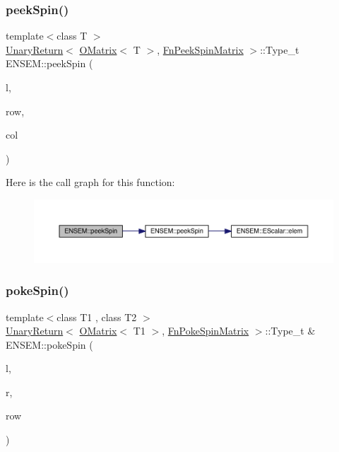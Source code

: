 \subsubsection{\texorpdfstring{peekSpin()}{peekSpin()}\hspace{0.1cm}{\footnotesize\ttfamily [2/2]}}
{\footnotesize\ttfamily template$<$class T $>$ \\
\mbox{\hyperlink{structENSEM_1_1UnaryReturn}{Unary\+Return}}$<$ \mbox{\hyperlink{classENSEM_1_1OMatrix}{O\+Matrix}}$<$ T $>$, \mbox{\hyperlink{structENSEM_1_1FnPeekSpinMatrix}{Fn\+Peek\+Spin\+Matrix}} $>$\+::Type\+\_\+t E\+N\+S\+E\+M\+::peek\+Spin (\begin{DoxyParamCaption}\item[{const \mbox{\hyperlink{classENSEM_1_1OMatrix}{O\+Matrix}}$<$ T $>$ \&}]{l,  }\item[{int}]{row,  }\item[{int}]{col }\end{DoxyParamCaption})\hspace{0.3cm}{\ttfamily [inline]}}

Here is the call graph for this function\+:\nopagebreak
\begin{figure}[H]
\begin{center}
\leavevmode
\includegraphics[width=350pt]{d8/d55/group__obsmatrix_ga5d47056fa4fb3fad4e48957e55c3cdec_cgraph}
\end{center}
\end{figure}
\mbox{\label{group__obsmatrix_ga45420280324408e59bcbaca0ead5aa55}} 
\subsubsection{\texorpdfstring{pokeSpin()}{pokeSpin()}\hspace{0.1cm}{\footnotesize\ttfamily [1/2]}}
{\footnotesize\ttfamily template$<$class T1 , class T2 $>$ \\
\mbox{\hyperlink{structENSEM_1_1UnaryReturn}{Unary\+Return}}$<$ \mbox{\hyperlink{classENSEM_1_1OMatrix}{O\+Matrix}}$<$ T1 $>$, \mbox{\hyperlink{structENSEM_1_1FnPokeSpinMatrix}{Fn\+Poke\+Spin\+Matrix}} $>$\+::Type\+\_\+t \& E\+N\+S\+E\+M\+::poke\+Spin (\begin{DoxyParamCaption}\item[{\mbox{\hyperlink{classENSEM_1_1OMatrix}{O\+Matrix}}$<$ T1 $>$ \&}]{l,  }\item[{const \mbox{\hyperlink{classENSEM_1_1OMatrix}{O\+Matrix}}$<$ T2 $>$ \&}]{r,  }\item[{int}]{row }\end{DoxyParamCaption})\hspace{0.3cm}{\ttfamily [inline]}}

